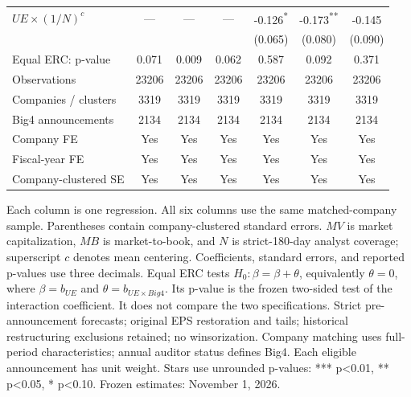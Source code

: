 \documentclass[10pt]{article}
\newcommand{\sym}[1]{\textsuperscript{#1}}
\begin{document}
\begin{tabular*}{\textwidth}{@{\extracolsep{\fill}}lcccccc@{}}
\(UE\times(1/N)^c\) & --- & --- & --- & -0.126\sym{*} & -0.173\sym{**} & -0.145\sym{} \\
 &  &  &  & (0.065) & (0.080) & (0.090) \\
\midrule
Equal ERC: p-value & 0.071 & 0.009 & 0.062 & 0.587 & 0.092 & 0.371 \\
Observations & 23206 & 23206 & 23206 & 23206 & 23206 & 23206 \\
Companies / clusters & 3319 & 3319 & 3319 & 3319 & 3319 & 3319 \\
Big4 announcements & 2134 & 2134 & 2134 & 2134 & 2134 & 2134 \\
Company FE & Yes & Yes & Yes & Yes & Yes & Yes \\
Fiscal-year FE & Yes & Yes & Yes & Yes & Yes & Yes \\
Company-clustered SE & Yes & Yes & Yes & Yes & Yes & Yes \\
\bottomrule\end{tabular*}\par\medskip
\noindent\footnotesize Each column is one regression. All six columns use the same matched-company sample. Parentheses contain company-clustered standard errors. \(MV\) is market capitalization, \(MB\) is market-to-book, and \(N\) is strict-180-day analyst coverage; superscript \(c\) denotes mean centering. Coefficients, standard errors, and reported p-values use three decimals. Equal ERC tests \(H_0:\beta=\beta+\theta\), equivalently \(\theta=0\), where \(\beta=b_{UE}\) and \(\theta=b_{UE\times Big4}\). Its p-value is the frozen two-sided test of the interaction coefficient. It does not compare the two specifications. Strict pre-announcement forecasts; original EPS restoration and tails; historical restructuring exclusions retained; no winsorization. Company matching uses full-period characteristics; annual auditor status defines Big4. Each eligible announcement has unit weight. Stars use unrounded p-values: *** p<0.01, ** p<0.05, * p<0.10. Frozen estimates: November 1, 2026.
\end{document}
